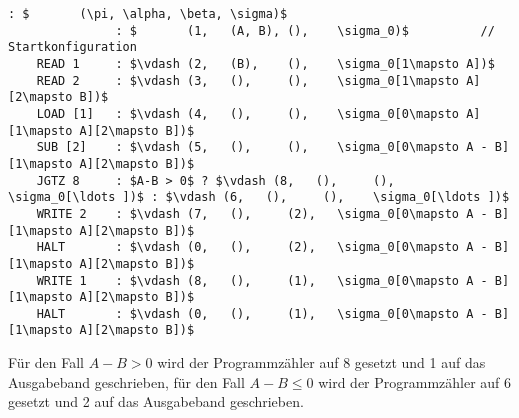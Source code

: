 \documentclass[main.tex]{subfiles}
\begin{document}
\begin{lstlisting}[language=RAM, caption={Beweis von RAM \ref{Programm 2}}, label={Beweis Programm 2}, firstnumber=-1]
               : $       (\pi, \alpha, \beta, \sigma)$
               : $       (1,   (A, B), (),    \sigma_0)$          // Startkonfiguration
    READ 1     : $\vdash (2,   (B),    (),    \sigma_0[1\mapsto A])$
    READ 2     : $\vdash (3,   (),     (),    \sigma_0[1\mapsto A][2\mapsto B])$
    LOAD [1]   : $\vdash (4,   (),     (),    \sigma_0[0\mapsto A][1\mapsto A][2\mapsto B])$
    SUB [2]    : $\vdash (5,   (),     (),    \sigma_0[0\mapsto A - B][1\mapsto A][2\mapsto B])$
    JGTZ 8     : $A-B > 0$ ? $\vdash (8,   (),     (),    \sigma_0[\ldots ])$ : $\vdash (6,   (),     (),    \sigma_0[\ldots ])$
    WRITE 2    : $\vdash (7,   (),     (2),   \sigma_0[0\mapsto A - B][1\mapsto A][2\mapsto B])$
    HALT       : $\vdash (0,   (),     (2),   \sigma_0[0\mapsto A - B][1\mapsto A][2\mapsto B])$
    WRITE 1    : $\vdash (8,   (),     (1),   \sigma_0[0\mapsto A - B][1\mapsto A][2\mapsto B])$
    HALT       : $\vdash (0,   (),     (1),   \sigma_0[0\mapsto A - B][1\mapsto A][2\mapsto B])$
\end{lstlisting}

Für den Fall $A-B > 0$ wird der Programmzähler auf 8 gesetzt und 1 auf das Ausgabeband geschrieben,
für den Fall $A-B \leq 0$ wird der Programmzähler auf 6 gesetzt und 2 auf das Ausgabeband geschrieben.
\end{document}
